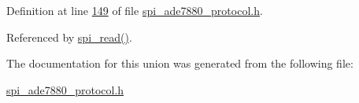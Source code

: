 Definition at line \hyperlink{a00041_source_l00149}{149} of file \hyperlink{a00041_source}{spi\-\_\-ade7880\-\_\-protocol.\-h}.



Referenced by \hyperlink{a00040_source_l00147}{spi\-\_\-read()}.



The documentation for this union was generated from the following file\-:\begin{DoxyCompactItemize}
\item 
\hyperlink{a00041}{spi\-\_\-ade7880\-\_\-protocol.\-h}\end{DoxyCompactItemize}
